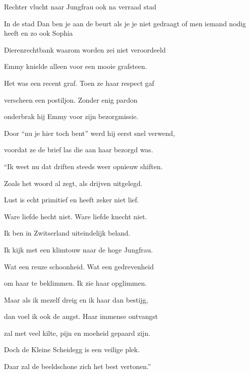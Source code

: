 Rechter vlucht naar Jungfrau ook na verraad stad

In de stad Dan ben je aan de beurt als je je niet gedraagt of men iemand nodig heeft en zo ook Sophia

Dierenrechtbank waarom worden zei niet veroordeeld

Emmy knielde alleen
voor een mooie grafsteen.

Het was een recent graf.
Toen ze haar respect gaf

verscheen een postiljon.
Zonder enig pardon

onderbrak hij Emmy
voor zijn bezorgmissie.

Door “nu je hier toch bent”
werd hij eerst snel verwend,

voordat ze de brief las
die aan haar bezorgd was.

“Ik weet nu dat driften
steeds weer opnieuw shiften.

Zoals het woord al zegt,
als drijven uitgelegd.

Lust is echt primitief
en heeft zeker niet lief.

Ware liefde hecht niet.
Ware liefde knecht niet.

Ik ben in Zwitserland
uiteindelijk beland.

Ik kijk met een klimtouw
naar de hoge Jungfrau.

Wat een reuze schoonheid.
Wat een gedrevenheid

om haar te beklimmen.
Ik zie haar opglimmen.

Maar als ik mezelf dreig
en ik haar dan bestijg,

dan voel ik ook de angst.
Haar immense ontvangst

zal met veel kilte, pijn
en moeheid gepaard zijn.

Doch de Kleine Scheidegg
is een veilige plek.

Daar zal de beeldschone
zich het best vertonen.”
